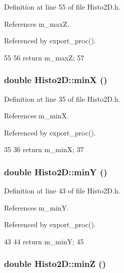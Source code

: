 Definition at line 55 of file Histo2D.h.

References m\_\-maxZ.

Referenced by export\_\-proc().


\begin{DoxyCode}
55                {
56     return m_maxZ;
57   }
\end{DoxyCode}
\hypertarget{classHisto2D_ae5a3ff63669999c9fda448db61e5bb57}{
\subsubsection[{minX}]{\setlength{\rightskip}{0pt plus 5cm}double Histo2D::minX ()}}
\label{classHisto2D_ae5a3ff63669999c9fda448db61e5bb57}


Definition at line 35 of file Histo2D.h.

References m\_\-minX.

Referenced by export\_\-proc().


\begin{DoxyCode}
35                {
36     return m_minX;
37   }
\end{DoxyCode}
\hypertarget{classHisto2D_ae946ecc8e7b4efc2e1454cd75c7d8aca}{
\subsubsection[{minY}]{\setlength{\rightskip}{0pt plus 5cm}double Histo2D::minY ()}}
\label{classHisto2D_ae946ecc8e7b4efc2e1454cd75c7d8aca}


Definition at line 43 of file Histo2D.h.

References m\_\-minY.

Referenced by export\_\-proc().


\begin{DoxyCode}
43                {
44     return m_minY;
45   }
\end{DoxyCode}
\hypertarget{classHisto2D_a68cfc2d92fbc5ce2efa1d6b5781ea621}{
\subsubsection[{minZ}]{\setlength{\rightskip}{0pt plus 5cm}double Histo2D::minZ ()}}
\label{classHisto2D_a68cfc2d92fbc5ce2efa1d6b5781ea621}


